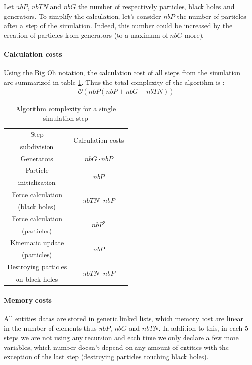 \documentclass[a4paper]{article} %
\begin{document}
\begin{multicols*}{2}
Let $nbP$, $nbTN$ and $nbG$ the number of respectively particles, black holes and generators.
To simplify the calculation, let's consider $nbP$ the number of particles after a step of the simulation.
Indeed, this number could be increased by the creation of particles from generators (to a maximum of $nbG$ more).



\paragraph{Calculation costs}
Using the Big Oh notation, the calculation cost of all steps from the simulation
are summarized in table \ref{tab-calc}. Thus the total complexity of the algorithm is :
\begin{align}
\mathcal{O}(nbP (nbP + nbG + nbTN))
\end{align}


\begin{table}[H]
\begin{center}
\begin{tabular}{|c|c|}
\hline
Step & \multicolumn{1}{|c|}{\multirow{2}{*}{Calculation costs}} \\
subdivision   &  \\
\hline
\hline
Generators &  $nbG\cdot nbP$\\
\hline
Particle  &       \multicolumn{1}{|c|}{\multirow{2}{*}{$nbP$}}\\
initialization &  \\
\hline
Force calculation  & \multicolumn{1}{|c|}{\multirow{2}{*}{$nbTN\cdot nbP$}}\\
(black holes) &  \\
\hline
Force calculation  & \multicolumn{1}{|c|}{\multirow{2}{*}{$nbP^2$}}\\
(particles) &  \\
\hline
Kinematic update  & \multicolumn{1}{|c|}{\multirow{2}{*}{$nbP$}}\\
(particles) &  \\
\hline
Destroying particles &  \multicolumn{1}{|c|}{\multirow{2}{*}{$nbTN\cdot nbP$}}\\
 on black holes &  \\
\hline
\end{tabular}
\end{center}
\caption{Algorithm complexity for a single simulation step}
\label{tab-calc}
\end{table}

\paragraph{Memory costs} All entities datas are stored in generic linked lists,
which memory cost are linear in the number of elements thus $nbP$, $nbG$ and $nbTN$.
In addition to this, in each 5 steps we are not using any recursion and each time we only
declare a few more variables, which number doesn't depend on any amount of entities
with the exception of the last step (destroying particles touching black holes).


\end{multicols*}
\end{document}
